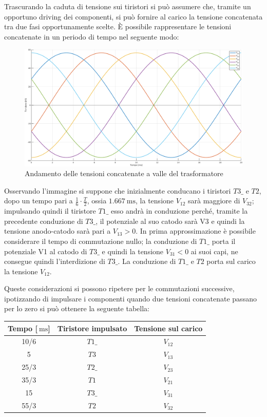 \documentclass[a4paper,11pt]{article}
\begin{document}
Trascurando la caduta di tensione sui tiristori si può assumere che, tramite un
opportuno driving dei componenti, si può fornire al carico la tensione
concatenata tra due fasi opportunamente scelte.
È possibile rappresentare le tensioni concatenate in un periodo di tempo nel seguente modo:
 \begin{figure}[H]
 \centering
 \includegraphics[keepaspectratio=true,width=0.85\linewidth]
 {concatenate_carico.png}
 \caption{Andamento delle tensioni concatenate a valle del trasformatore}
 \label{fig:concatenate}
\end{figure}

Osservando l'immagine si suppone che inizialmente conducano i tiristori \(T3\_\) e \(T2\),
dopo un tempo pari a \(\frac{1}{6}\cdot \frac{T}{2}\), ossia
$\SI{1.667}{\milli\second}$, la tensione \(V_{12}\) sarà maggiore 
di \(V_{32}\); impulsando quindi il tiristore \(T1\_\) esso andrà in conduzione perché, tramite 
la precedente conduzione di \(T3\_\), il potenziale al suo catodo sarà V3 e quindi la tensione 
anodo-catodo sarà pari a \(V_{13} > 0 \).
In prima approssimazione è possibile considerare il tempo di commutazione nullo;
la conduzione di \(T1\_\) porta il potenziale V1 al catodo di \(T3\_\) e 
quindi la tensione \(V_{31} < 0\) ai suoi capi, ne consegue quindi
l'interdizione di \(T3\_\).
La conduzione di \(T1\_\) e \(T2\) porta sul carico la tensione \(V_{12}\).
\smallskip

Queste considerazioni si possono ripetere per le commutazioni successive, ipotizzando
di impulsare i componenti quando due tensioni concatenate passano per lo zero si può 
ottenere la seguente tabella:

\begin{center}
\begin{tabular}{c|c|c}
  Tempo [$\SI{}{\milli\second}$]&Tiristore impulsato&Tensione sul carico\\ \hline
  10/6 & \(T1\_\) & \(V_{12}\) \\
  5    & \(T3\)   & \(V_{13}\) \\
  25/3 & \(T2\_\) & \(V_{23}\) \\
  35/3 & \(T1\)   & \(V_{21}\) \\
  15   & \(T3\_\) & \(V_{31}\) \\
  55/3 & \(T2\)   & \(V_{32}\)
\end{tabular}
\end{center}
\end{document}
